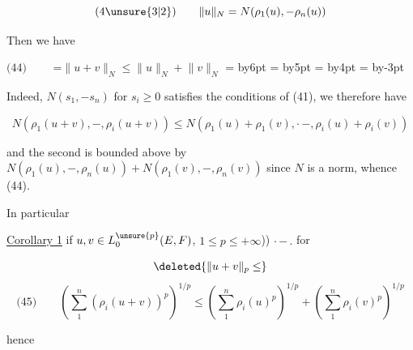 \[
\text{(4\unsure{3|2})}\qquad
\lVert u\rVert_N=N(\rho_1(u),\mathord{-}\rho_n(u))
\]

Then we have

\begin{center}
\(\text{(44)}\qquad\)
\begingroup
{}=\hbox{$\lVert u+v\rVert_N\leq\lVert u\rVert_N+\lVert v\rVert_N$}
=\advance{} by6pt
=\advance{} by5pt
=\advance{} by4pt
=\advance{} by-3pt
\leavevmode\hspace{3pt}
\hspace{6pt}
\endgroup
\end{center}


Indeed, $N(s_1,\mathord{-}s_n)$ for $s_i\geq0$ satisfies the conditions of (41), we therefore have

\[
N(\rho_1(u+v),\mathord{-},\rho_i(u+v))\leq
N(\rho_1(u)+\rho_1(v),\mathord{\cdot}\,\mathord{-},\rho_i(u)+\rho_i(v))
\]

and the second  is bounded above by $N(\rho_1(u),\mathord{-},\rho_n(u))+N(\rho_1(v),\mathord{-},\rho_n(v))$ since $N$ is a norm, whence (44).

In particular

\uline{Corollary 1}  if $u,v\in L_0^{\unsure{p}}(E,F)$,   $1\leq p\leq+\infty$)) $\mathord{\cdot}\,\mathord{-}\,.$ for  

\[
\deleted{\lVert u+v\rVert_p\leq}
\]
\[
\text{(45)}\qquad
\left(\sum_1^n(\rho_i(u+v))^p\right)^{1/p}\leq
\left(\sum_1^n\rho_i(u)^p\right)^{1/p}+
\left(\sum_1^n\rho_i(v)^p\right)^{1/p}
\]

hence   \deleted{$\unsure{\sum}$}

